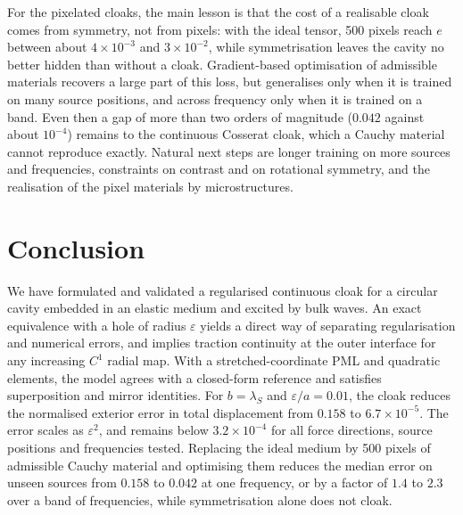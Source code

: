 \documentclass[preprint,12pt]{elsarticle}
\begin{document}
For the pixelated cloaks, the main lesson is that the cost of a realisable cloak comes from symmetry, not from pixels: with
the ideal tensor, 500 pixels reach $e$ between about $4\times10^{-3}$ and $3\times10^{-2}$, while symmetrisation leaves the cavity no better hidden than without a cloak.
Gradient-based optimisation of admissible materials recovers a large part of this loss, but generalises only when it is trained on many source
positions, and across frequency only when it is trained on a band. Even then a gap of more than two orders of magnitude ($0.042$ against about $10^{-4}$) remains to the
continuous Cosserat cloak, which a Cauchy material cannot reproduce exactly. Natural next steps are longer training on more sources and frequencies,
constraints on contrast and on rotational symmetry, and the realisation of the pixel materials by microstructures.

\section{Conclusion}\label{sec:conclusion}

We have formulated and validated a regularised continuous cloak for a circular cavity embedded in an elastic medium and excited by bulk waves. An exact equivalence with a hole of radius $\varepsilon$ yields a direct way of separating regularisation and numerical errors, and implies traction continuity at the outer interface for any increasing $C^1$ radial map. With a stretched-coordinate PML and quadratic elements, the model agrees with a closed-form reference and satisfies superposition and mirror identities. For $b=\lambda_S$ and $\varepsilon/a=0.01$, the cloak reduces the normalised exterior error in total displacement from $0.158$ to $6.7\times10^{-5}$. The error scales as $\varepsilon^2$, and remains below $3.2\times10^{-4}$ for all force directions, source positions and frequencies tested. Replacing the ideal medium by 500 pixels of admissible Cauchy material and optimising them reduces the median error on unseen sources from
$0.158$ to $0.042$ at one frequency, or by a factor of $1.4$ to $2.3$ over a band of frequencies, while symmetrisation alone does not cloak.
\end{document}
